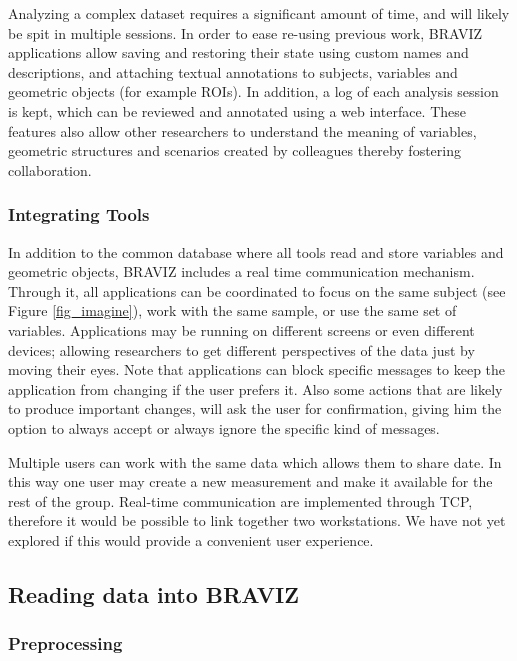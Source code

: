 \documentclass[twocolumn]{svjour3}
\begin{document}
Analyzing a complex dataset requires a significant amount of time, and will likely be spit in multiple sessions. In order to ease re-using previous work, BRAVIZ applications allow saving and restoring their state using custom names and descriptions, and attaching textual annotations to subjects, variables and geometric objects (for example ROIs). In addition, a log of each analysis session is kept, which can be reviewed and annotated using a web interface. These features also allow other researchers to understand the meaning of variables, geometric structures and scenarios created by colleagues thereby fostering collaboration. 

\subsubsection{Integrating Tools}

In addition to the common database where all tools read and store variables and geometric objects, BRAVIZ includes a real time communication mechanism. Through it, all applications can be coordinated to focus on the same subject (see Figure \ref{fig_imagine}), work with the same sample, or use the same set of variables. Applications may be running on different screens or even different devices; allowing researchers to get different perspectives of the data just by moving their eyes. Note that applications can block specific messages to keep the application from changing if the user prefers it. Also some actions that are likely to produce important changes, will ask the user for confirmation, giving him the option to always accept or always ignore the specific kind of messages.

Multiple users can work with the same data  which allows them to share date. In this way one user may create a new measurement and make it available for the rest of the group. Real-time communication are implemented through TCP, therefore it would be possible to link together two workstations. We have not yet explored if this would provide a convenient user experience.



\subsection{Reading data into BRAVIZ}


\subsubsection{Preprocessing}
\end{document}
